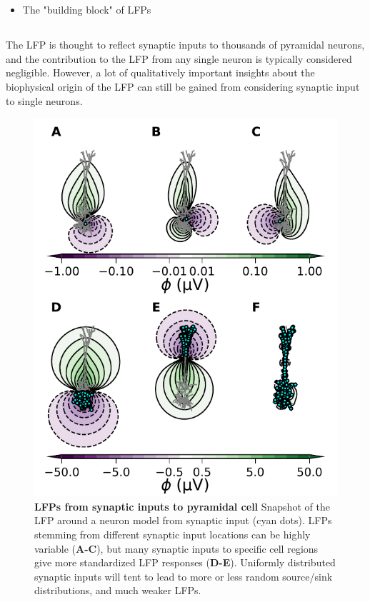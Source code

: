 \section{}

\begin{itemize}
\item The "building block" of LFPs
\end{itemize}

\subsection{}

The LFP is thought to reflect synaptic inputs to thousands of pyramidal neurons, and the contribution to the LFP from any single neuron is typically considered negligible. However, a lot of qualitatively important insights about the biophysical origin of the LFP can still be gained from considering synaptic input to single neurons. 

\begin{figure}[!ht]
\begin{center}
\includegraphics[width=.6\textwidth]{Figures/LFP/fig_chosen_dipoles.pdf}
\end{center}
\caption{\textbf{LFPs from synaptic inputs to pyramidal cell}
Snapshot of the LFP around a neuron model from synaptic input (cyan dots). LFPs stemming from different synaptic input locations can be highly variable ({\bf A-C}), but many synaptic inputs to specific cell regions give more standardized LFP responses ({\bf D-E}). Uniformly distributed synaptic inputs will tent to lead to more or less random source/sink distributions, and much weaker LFPs.
}
\label{fig:LFP:LFP_dipoles}
\end{figure}


